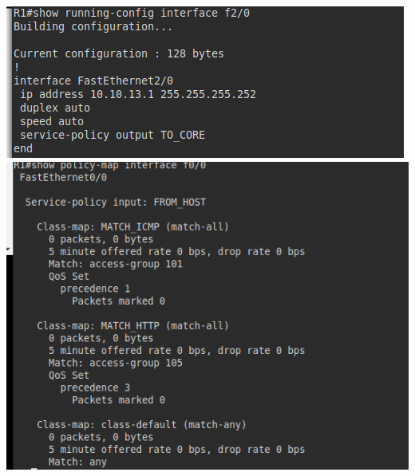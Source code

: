 \documentclass[10pt]{article}
\begin{document}
\begin{center}
  \includegraphics[scale=0.5]{imgs/7.png}\\
  \includegraphics[scale=0.5]{imgs/8.png}\\

\end{center}
\end{document}
